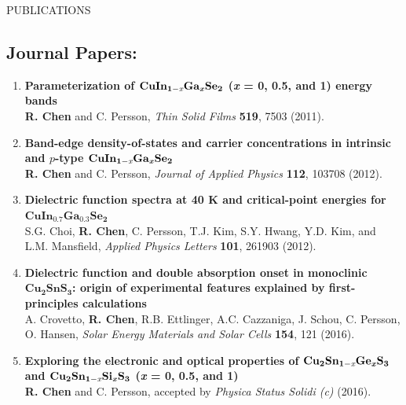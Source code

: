 \documentclass{resume} %
\begin{document}
\newpage
\begin{rSection}{PUBLICATIONS}

\subsection*{Journal Papers:}
 
 \begin{enumerate}
\renewcommand{\labelenumi}{\Roman{enumi}}



\item{}  \textbf{Parameterization of $\mathbf {CuIn_{1-\textit{x}}Ga_\textbf{\textit{x}}Se_2}$ (\textbf{\textit{x}} = 0, 0.5, and 1) energy bands}
\\\textbf{R. Chen} and C. Persson, \textit{Thin Solid Films} {\textbf {519}}, 7503 (2011).



\item{}\textbf{Band-edge density-of-states and carrier concentrations in intrinsic and $p$-type $\mathbf {CuIn_{1-\textit{x}}Ga_\textbf{\textit{x}}Se_2}$}
\\\textbf{R. Chen} and C. Persson, \textit{Journal of Applied Physics} {\textbf {112}}, 103708 (2012).

\item{} \textbf{Dielectric function spectra at 40 K and critical-point energies for $\mathbf {CuIn_{0.7}Ga_{0.3}Se_2}$}
\\ S.G. Choi, \textbf{R. Chen}, C. Persson, T.J. Kim, S.Y. Hwang, Y.D. Kim, and L.M. Mansfield,
\textit{Applied Physics Letters} {\textbf {101}}, 261903 (2012).

\item{} \textbf{Dielectric function and double absorption onset in monoclinic $\mathbf {Cu_{2}SnS_{3}}$: origin of experimental features explained by first-principles calculations}
\\ A. Crovetto, \textbf{R. Chen}, R.B. Ettlinger, A.C. Cazzaniga, J. Schou, C. Persson, O. Hansen,
\textit{Solar Energy Materials and Solar Cells} {\textbf {154}}, 121 (2016).

\item{} \textbf{Exploring the electronic and optical properties of $\mathbf {Cu_{2}Sn_{1-\textit{x}}Ge_\textbf{\textit{x}}S_{3}}$ and $\mathbf {Cu_{2}Sn_{1-\textit{x}}Si_\textbf{\textit{x}}S_{3}}$ (\textbf{\textit{x}} = 0, 0.5, and 1)}
\\ \textbf{R. Chen} and C. Persson, accepted by \textit{Physica Status Solidi (c)} (2016).


\end{enumerate}
\end{rSection}
\end{document}

